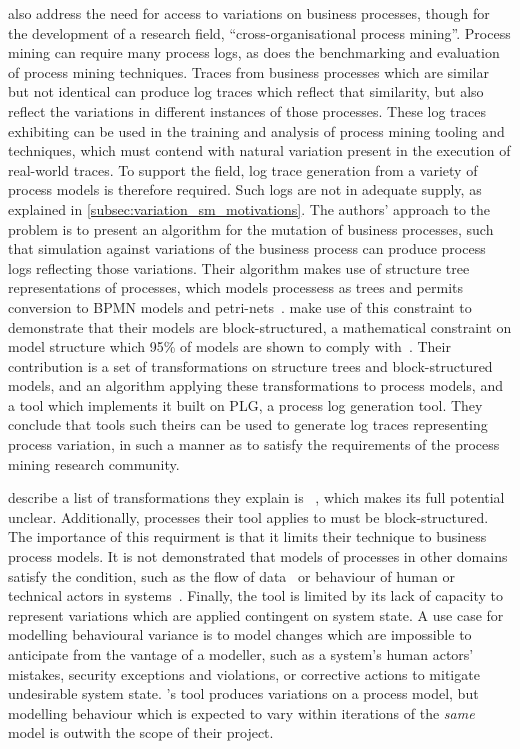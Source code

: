 \citeauthor{pourmasoumi2015business} also address the need for access to
variations on business processes, though for the development of a research
field, ``cross-organisational process mining''\cite{pourmasoumi2015business}.
Process mining can require many process logs, as does the benchmarking and
evaluation of process mining techniques. Traces from business processes which
are similar but not identical can produce log traces which reflect that
similarity, but also reflect the variations in different instances of those
processes. These log traces exhibiting can be used in the training and analysis
of process mining tooling and techniques, which must contend with natural
variation present in the execution of real-world traces. To support the field,
log trace generation from a variety of process models is therefore required.
Such logs are not in adequate supply, as explained in
\cref{subsec:variation_sm_motivations}. The authors' approach to the problem is
to present an algorithm for the mutation of business processes, such that
simulation against variations of the business process can produce process logs
reflecting those variations. Their algorithm makes use of structure tree
representations of processes, which models processess as trees and permits
conversion to BPMN models and petri-nets~\cite{buijs2014flexible}.
\citeauthor{pourmasoumi2015business} make use of this constraint to demonstrate
that their models are block-structured, a mathematical constraint on model
structure which 95\% of models are shown to comply with~\cite{chenthesis}. Their
contribution is a set of transformations on structure trees and block-structured
models, and an algorithm applying these transformations to process models, and a
tool which implements it built on PLG, a process log generation tool. They
conclude that tools such theirs can be used to generate log traces representing
process variation, in such a manner as to satisfy the requirements of the
process mining research community.

\citeauthor{pourmasoumi2015business} describe a list of transformations they
explain is ~\cite{pourmasoumi2015business}, which makes its full potential
unclear. Additionally, processes their tool applies to must be block-structured.
The importance of this requirment is that it limits their technique to business
process models. It is not demonstrated that models of processes in other domains
satisfy the condition, such as the flow of data~\cite{obashimethodology} or
behaviour of human or technical actors in \sociotechnical
systems~\cite{wallis2018caise}. Finally, the tool is limited by its lack of
capacity to represent variations which are applied contingent on system state. A
use case for modelling behavioural variance is to model changes which are
impossible to anticipate from the vantage of a modeller, such as a
\sociotechnical system's human actors' mistakes, security exceptions and
violations, or corrective actions to mitigate undesirable system state.
\citeauthor{pourmasoumi2015business}'s tool produces variations on a process
model, but modelling behaviour which is expected to vary within iterations of
the \emph{same} model is outwith the scope of their project.



